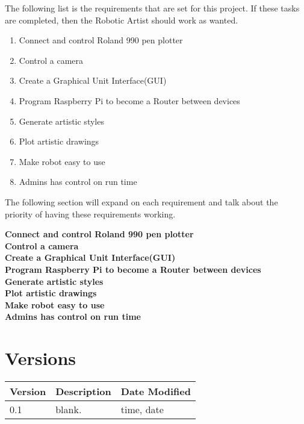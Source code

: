 \documentclass{article}
\begin{document}
The following list is the requirements that are set for this project. If these tasks are completed, then the Robotic Artist should work as wanted.

\begin{enumerate}
  \item Connect and control Roland 990 pen plotter
  \item Control a camera
  \item Create a Graphical Unit Interface(GUI)
  \item Program Raspberry Pi to become a Router between devices
  \item Generate artistic styles
  \item Plot artistic drawings
  \item Make robot easy to use
  \item Admins has control on run time
\end{enumerate}

The following section will expand on each requirement and talk about the priority of having these requirements working.\\ \newline

\textbf{Connect and control Roland 990 pen plotter} \\
\textbf{Control a camera} \\
\textbf{Create a Graphical Unit Interface(GUI)}\\
\textbf{Program Raspberry Pi to become a Router between devices}\\
\textbf{Generate artistic styles}\\
\textbf{Plot artistic drawings}\\
\textbf{Make robot easy to use}\\
\textbf{Admins has control on run time}\\



    \section{Versions}


\begin{center}

\begin{tabular}{| l | p{8cm} | p{3cm}|}

\hline

\textbf{Version} & \textbf{Description} & \textbf{Date Modified} \\\hline

0.1 & blank. & time, date \\ \hline


\end{tabular}

\end{center}

 
\end{document}
